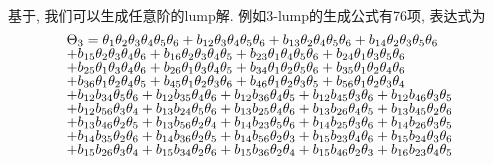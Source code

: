 基于, 我们可以生成任意阶的lump解. 例如3-lump的生成公式有76项, 表达式为
\begin{equation}
\def\arraystretch{0.8} 
\begin{array}{l}
\Theta_3=\theta_{{1}}\theta_{{2}}\theta_{{3}}\theta_{{4}}\theta_{{5}}\theta_{{6}}
+b_{{12}}\theta_{{3}}\theta_{{4}}\theta_{{5}}\theta_{{6}}
+b_{{13}}\theta_{{2}}\theta_{{4}}\theta_{{5}}\theta_{{6}}
+b_{{14}}\theta_{{2}}\theta_{{3}}\theta_{{5}}\theta_{{6}}\\
+b_{{15}}\theta_{{2}}\theta_{{3}}\theta_{{4}}\theta_{{6}}
+b_{{16}}\theta_{{2}}\theta_{{3}}\theta_{{4}}\theta_{{5}}
+b_{{23}}\theta_{{1}}\theta_{{4}}\theta_{{5}}\theta_{{6}}
+b_{{24}}\theta_{{1}}\theta_{{3}}\theta_{{5}}\theta_{{6}}\\
+b_{{25}}\theta_{{1}}\theta_{{3}}\theta_{{4}}\theta_{{6}}
+b_{{26}}\theta_{{1}}\theta_{{3}}\theta_{{4}}\theta_{{5}}
+b_{{34}}\theta_{{1}}\theta_{{2}}\theta_{{5}}\theta_{{6}}
+b_{{35}}\theta_{{1}}\theta_{{2}}\theta_{{4}}\theta_{{6}}\\
+b_{{36}}\theta_{{1}}\theta_{{2}}\theta_{{4}}\theta_{{5}}
+b_{{45}}\theta_{{1}}\theta_{{2}}\theta_{{3}}\theta_{{6}}
+b_{{46}}\theta_{{1}}\theta_{{2}}\theta_{{3}}\theta_{{5}}
+b_{{56}}\theta_{{1}}\theta_{{2}}\theta_{{3}}\theta_{{4}}\\
+b_{{12}}b_{{34}}\theta_{{5}}\theta_{{6}}
+b_{{12}}b_{{35}}\theta_{{4}}\theta_{{6}}
+b_{{12}}b_{{36}}\theta_{{4}}\theta_{{5}}
+b_{{12}}b_{{45}}\theta_{{3}}\theta_{{6}}
+b_{{12}}b_{{46}}\theta_{{3}}\theta_{{5}}\\
+b_{{12}}b_{{56}}\theta_{{3}}\theta_{{4}}
+b_{{13}}b_{{24}}\theta_{{5}}\theta_{{6}}
+b_{{13}}b_{{25}}\theta_{{4}}\theta_{{6}}
+b_{{13}}b_{{26}}\theta_{{4}}\theta_{{5}}
+b_{{13}}b_{{45}}\theta_{{2}}\theta_{{6}}\\
+b_{{13}}b_{{46}}\theta_{{2}}\theta_{{5}}
+b_{{13}}b_{{56}}\theta_{{2}}\theta_{{4}}
+b_{{14}}b_{{23}}\theta_{{5}}\theta_{{6}}
+b_{{14}}b_{{25}}\theta_{{3}}\theta_{{6}}
+b_{{14}}b_{{26}}\theta_{{3}}\theta_{{5}}\\
+b_{{14}}b_{{35}}\theta_{{2}}\theta_{{6}}
+b_{{14}}b_{{36}}\theta_{{2}}\theta_{{5}}
+b_{{14}}b_{{56}}\theta_{{2}}\theta_{{3}}
+b_{{15}}b_{{23}}\theta_{{4}}\theta_{{6}}
+b_{{15}}b_{{24}}\theta_{{3}}\theta_{{6}}\\
+b_{{15}}b_{{26}}\theta_{{3}}\theta_{{4}}
+b_{{15}}b_{{34}}\theta_{{2}}\theta_{{6}}
+b_{{15}}b_{{36}}\theta_{{2}}\theta_{{4}}
+b_{{15}}b_{{46}}\theta_{{2}}\theta_{{3}}
+b_{{16}}b_{{23}}\theta_{{4}}\theta_{{5}}\\

\end{array}
\end{equation}
